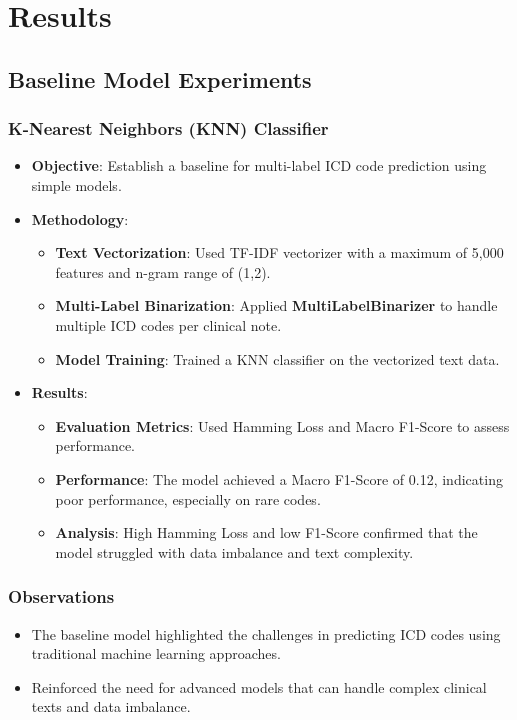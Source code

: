 \chapter{Results}

\section{Baseline Model Experiments}

\subsection{K-Nearest Neighbors (KNN) Classifier}
\begin{itemize}
    \item \textbf{Objective}: Establish a baseline for multi-label ICD code prediction using simple models.
    \item \textbf{Methodology}:
    \begin{itemize}
        \item \textbf{Text Vectorization}: Used TF-IDF vectorizer with a maximum of 5,000 features and n-gram range of (1,2).
        \item \textbf{Multi-Label Binarization}: Applied \textbf{MultiLabelBinarizer} to handle multiple ICD codes per clinical note.
        \item \textbf{Model Training}: Trained a KNN classifier on the vectorized text data.
    \end{itemize}
    \item \textbf{Results}:
    \begin{itemize}
        \item \textbf{Evaluation Metrics}: Used Hamming Loss and Macro F1-Score to assess performance.
        \item \textbf{Performance}: The model achieved a Macro F1-Score of 0.12, indicating poor performance, especially on rare codes.
        \item \textbf{Analysis}: High Hamming Loss and low F1-Score confirmed that the model struggled with data imbalance and text complexity.
    \end{itemize}
\end{itemize}

\subsection{Observations}
\begin{itemize}
    \item The baseline model highlighted the challenges in predicting ICD codes using traditional machine learning approaches.
    \item Reinforced the need for advanced models that can handle complex clinical texts and data imbalance.
\end{itemize}

